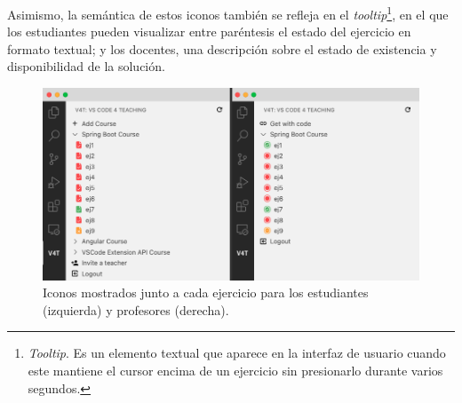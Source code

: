 Asimismo, la semántica de estos iconos también se refleja en el \textit{tooltip}\footnote{\textit{Tooltip}. Es un elemento textual que aparece en la interfaz de usuario cuando este mantiene el cursor encima de un ejercicio sin presionarlo durante varios segundos.}, en el que los estudiantes pueden visualizar entre paréntesis el estado del ejercicio en formato textual; y los docentes, una descripción sobre el estado de existencia y disponibilidad de la solución.

\begin{figure}[!ht]
    \centering
    \includegraphics[width=\textwidth]{imagenes/utilizadas/4-3-implementacion/rf11-1.png}
    \caption{Iconos mostrados junto a cada ejercicio para los estudiantes (izquierda) y profesores (derecha).}
    \label{fig:reqf11-1}
\end{figure}
